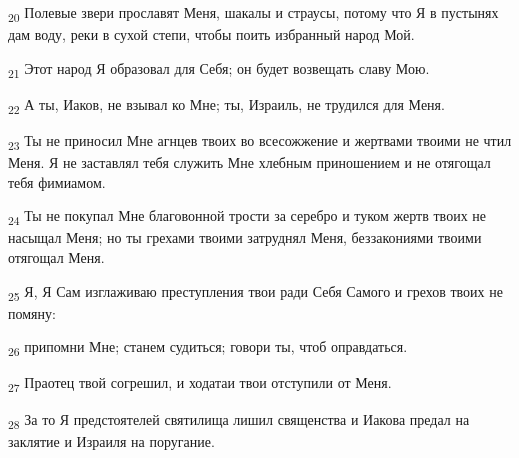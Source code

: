 \begin{tcolorbox}
\textsubscript{20} Полевые звери прославят Меня, шакалы и страусы, потому что Я в пустынях дам воду, реки в сухой степи, чтобы поить избранный народ Мой.
\end{tcolorbox}
\begin{tcolorbox}
\textsubscript{21} Этот народ Я образовал для Себя; он будет возвещать славу Мою.
\end{tcolorbox}
\begin{tcolorbox}
\textsubscript{22} А ты, Иаков, не взывал ко Мне; ты, Израиль, не трудился для Меня.
\end{tcolorbox}
\begin{tcolorbox}
\textsubscript{23} Ты не приносил Мне агнцев твоих во всесожжение и жертвами твоими не чтил Меня. Я не заставлял тебя служить Мне хлебным приношением и не отягощал тебя фимиамом.
\end{tcolorbox}
\begin{tcolorbox}
\textsubscript{24} Ты не покупал Мне благовонной трости за серебро и туком жертв твоих не насыщал Меня; но ты грехами твоими затруднял Меня, беззакониями твоими отягощал Меня.
\end{tcolorbox}
\begin{tcolorbox}
\textsubscript{25} Я, Я Сам изглаживаю преступления твои ради Себя Самого и грехов твоих не помяну:
\end{tcolorbox}
\begin{tcolorbox}
\textsubscript{26} припомни Мне; станем судиться; говори ты, чтоб оправдаться.
\end{tcolorbox}
\begin{tcolorbox}
\textsubscript{27} Праотец твой согрешил, и ходатаи твои отступили от Меня.
\end{tcolorbox}
\begin{tcolorbox}
\textsubscript{28} За то Я предстоятелей святилища лишил священства и Иакова предал на заклятие и Израиля на поругание.
\end{tcolorbox}

